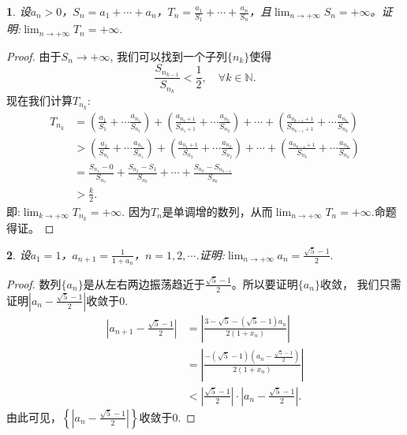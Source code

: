 \documentclass[utf8]{book}
\newtheorem{example}{}[section]             %
\begin{document}
\begin{example}
设$a_n > 0$，$S_n=a_1+\cdots+a_n$，$T_n=\frac{a_1}{S_1}+\cdots+\frac{a_n}{S_n}$，且$\displaystyle  \lim_{n\to +\infty}S_n=+\infty$。证明:$\displaystyle  \lim_{n\to +\infty}T_n=+\infty.$
\end{example}
\begin{proof}
由于$S_n \rightarrow  +\infty$, 我们可以找到一个子列$\{n_k\}$使得
$$\frac{S_{n_{k-1}}}{S_{n_k}} < \frac{1}{2}, \quad\forall k\in\mathbb{N}.$$
现在我们计算$T_{n_k}$:
\begin{equation*}
\begin{split}
T_{n_k} &= \left(\frac{a_1}{S_1}+\cdots \frac{a_{n_1}}{S_{n_1}}\right) + \left(\frac{a_{n_1+1}}{S_{n_1+1}}+\cdots \frac{a_{n_2}}{S_{n_2}}\right) +\cdots+\left(\frac{a_{n_{k-1}+1}}{S_{n_{k-1}+1}}+\cdots \frac{a_{n_k}}{S_{n_k}}\right) \\
&> \left(\frac{a_1}{S_{n_1}}+\cdots \frac{a_{n_1}}{S_{n_1}}\right) + \left(\frac{a_{n_1+1}}{S_{n_2}}+\cdots \frac{a_{n_2}}{S_{n_2}}\right) +\cdots+\left(\frac{a_{n_{k-1}+1}}{S_{n_k}}+\cdots \frac{a_{n_k}}{S_{n_k}}\right)\\
&=\frac{S_{n_1}- 0}{S_{n_1}} + \frac{S_{n_2}-S_1}{S_{n_2}} + \cdots +  \frac{S_{n_k}-S_{n_{k-1}}}{S_{n_{k}}}\\
&>\frac{k}{2}.
\end{split}
\end{equation*}
即:$\displaystyle \lim_{k\to +\infty}T_{n_k}=+\infty.$
因为$T_n$是单调增的数列，从而$\displaystyle \lim_{n\to +\infty}T_{n}=+\infty.$命题 得证。
\end{proof}
\begin{example}
设$a_1=1$，$a_{n+1}=\frac{1}{1+a_n}$，$n=1,2,\cdots$.证明:$\displaystyle  \lim_{n\to +\infty}a_n=\frac{\sqrt{5}-1}{2}.$
\end{example}
\begin{proof}数列$\{a_n\}$是从左右两边振荡趋近于$\frac{\sqrt{5}-1}{2}$。所以要证明$\{a_n\}$收敛， 我们只需证明$\left|a_n -\frac{\sqrt{5}-1}{2}\right|$收敛于$0$.
\begin{equation*}
\begin{split}
\left|a_{n+1} - \frac{\sqrt{5}-1}{2}\right| &= \left|\frac{3-\sqrt{5} - (\sqrt{5}-1)a_n}{2(1+x_n)}\right|\\
&=\left|\frac{-(\sqrt{5}-1)\left(a_n-\frac{\sqrt{5}-1}{2}\right)}{2(1+x_n)}\right|\\
&<\left|\frac{\sqrt{5}-1}{2}\right|\cdot\left|a_n-\frac{\sqrt{5}-1}{2}\right|.
\end{split}
\end{equation*}
由此可见，$\left\{\left|a_n-\frac{\sqrt{5}-1}{2}\right|\right\}$收敛于$0$.
\end{proof}
\end{document}
